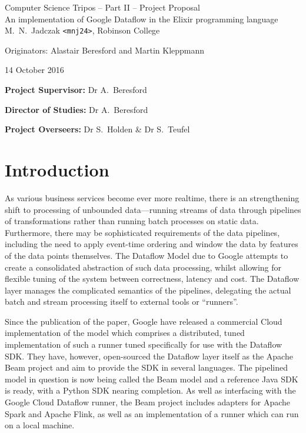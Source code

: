 \documentclass[11pt]{scrartcl}
\begin{document}
\begin{center}
\Large
Computer Science Tripos -- Part II -- Project Proposal\\[4mm]
\LARGE
An implementation of Google Dataflow in the Elixir programming language\\[4mm]

\large
M.~N.~Jadczak \texttt{<mnj24>}, Robinson College

Originators: Alastair Beresford and Martin Kleppmann

14 October 2016
\end{center}

\vspace{5mm}

\textbf{Project Supervisor:} Dr A.~Beresford

\textbf{Director of Studies:} Dr A.~Beresford

\textbf{Project Overseers:} Dr S.~Holden  \& Dr S.~Teufel


\section*{Introduction}

As various business services become ever more realtime, there is an strengthening shift to processing of unbounded data---running streams of data through pipelines of transformations rather than running batch processes on static data. Furthermore, there may be sophisticated requirements of the data pipelines, including the need to apply event-time ordering and window the data by features of the data points themselves. The Dataflow Model due to Google \cite{Akidau:2015} attempts to create a consolidated abstraction of such data processing, whilst allowing for flexible tuning of the system between correctness, latency and cost. The Dataflow layer manages the complicated semantics of the pipelines, delegating the actual batch and stream processing itself to external tools or ``runners''.

Since the publication of the paper, Google have released a commercial Cloud implementation of the model \cite{CloudDataflow} which comprises a distributed, tuned implementation of such a runner tuned specifically for use with the Dataflow SDK. They have, however, open-sourced the Dataflow layer itself as the Apache Beam project \cite{ApacheBeam} and aim to provide the SDK in several languages. The pipelined model in question is now being called the Beam model and a reference Java SDK is ready, with a Python SDK nearing completion. As well as interfacing with the Google Cloud Dataflow runner, the Beam project includes adapters for Apache Spark and Apache Flink, as well as an implementation of a runner which can run on a local machine.
\end{document}
